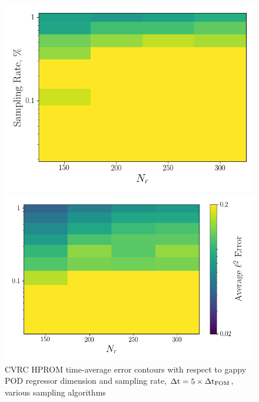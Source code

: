 \begin{figure}
	\begin{minipage}{0.46\linewidth}
		\includegraphics[width=0.99\linewidth]{Chapters/CavityAndCVRC/Images/cvrc/deim/err_contour_gnat1_dt5e-7.png}
	\end{minipage}
	\begin{minipage}{0.53\linewidth}
		\includegraphics[width=0.99\linewidth]{Chapters/CavityAndCVRC/Images/cvrc/deim/err_contour_gnat2_dt5e-7.png}
	\end{minipage}
	\caption{CVRC HPROM time-average error contours with respect to gappy POD regressor dimension and sampling rate, $\Delta \text{t} = 5 \times \Delta \text{t}_{\text{FOM}}$, various sampling algorithms}
\end{figure}

